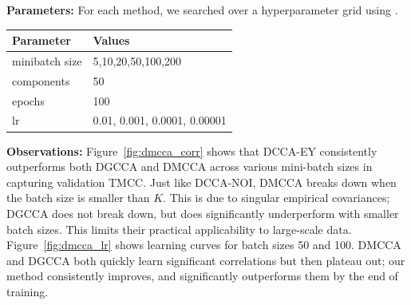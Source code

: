 \textbf{Parameters:} For each method, we searched over a hyperparameter grid using \citet{wandb}.

\begin{table}[h!]
    \centering
    \begin{tabular}{|l|l|}
        \hline Parameter      & Values                       \\
        \hline minibatch size & 5,10,20,50,100,200           \\
        \hline components     & 50                           \\
        \hline epochs         & 100                          \\
        \hline lr             & 0.01, 0.001, 0.0001, 0.00001 \\
        \hline
    \end{tabular}
\end{table}

\textbf{Observations:}
Figure~\ref{fig:dmcca_corr} shows that DCCA-EY consistently outperforms both DGCCA and DMCCA across various mini-batch sizes in capturing validation TMCC.
Just like DCCA-NOI, DMCCA breaks down when the batch size is smaller than $K$. This is due to singular empirical covariances; DGCCA does not break down, but does significantly underperform with smaller batch sizes.
This limits their practical applicability to large-scale data.
Figure~\ref{fig:dmcca_lr} shows learning curves for batch sizes 50 and 100.
DMCCA and DGCCA both quickly learn significant correlations but then plateau out; our method consistently improves, and significantly outperforms them by the end of training.


